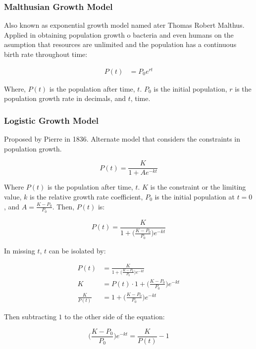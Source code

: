 \documentclass[12pt, UTF8]{article}
\begin{document}
	\subsubsection*{Malthusian Growth Model}

	Also known as exponential growth model named ater Thomas Robert Malthus. Applied in obtaining population growth o bacteria and even humans on the asumption that resources are unlimited and the population has a continuous birth rate throughout time:

	\begin{align}
		P(t) &= P_{0} e^{rt}
	\end{align}

	Where, $P(t)$ is the population after time, $t$. $P_{0}$ is the initial population, $r$ is the population growth rate in decimals, and $t$, time.

	\subsubsection*{Logistic Growth Model}

	Proposed by Pierre in 1836. Alternate model that considers the constraints in population growth.

	\begin{equation}
		P(t) = \frac{K}{1 + Ae^{-kt}}
	\end{equation}

	Where $P(t)$ is the population after time, $t$. $K$ is the constraint or the limiting value, $k$ is the relative growth rate coefficient, $P_{0}$ is the initial population at $t = 0$, and $A = \frac{K - P_{0}}{P_{0}}$. Then, $P(t)$ is:

	\begin{equation}
		P(t) = \frac{K}{1 + \big(\frac{K - P_{0}}{P_{0}}\big)e^{-kt}}
	\end{equation}

	In missing $t$, $t$ can be isolated by:

	\begin{align}
		P(t) &= \frac{K}{1 + \Big(\frac{K - P_{0}}{P_{0}}\Big)e^{-kt}}  \nonumber \\
		K &= P(t) \cdot 1 + \Big(\frac{K - P_{0}}{P_{0}}\Big)e^{-kt}  \nonumber \\
		\frac{K}{P(t)} &= 1 + \Big(\frac{K - P_{0}}{P_{0}}\Big)e^{-kt}  \nonumber
	\end{align}

	Then subtracting $1$ to the other side of the equation:

	\begin{equation}
		\Big(\frac{K - P_{0}}{P_{0}}\Big)e^{-kt} = \frac{K}{P(t)} - 1
	\end{equation}
\end{document}
